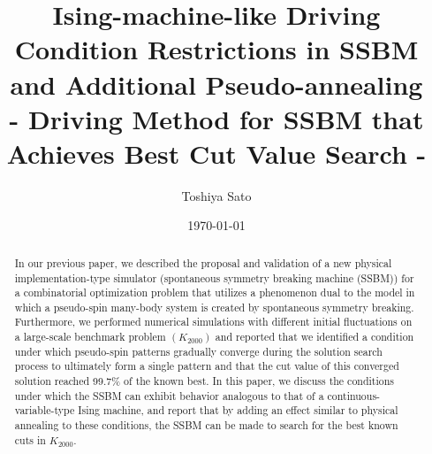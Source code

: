 \documentclass[%
 reprint,
 amsmath,amssymb,
 aps,
]{revtex4-2}
\begin{document}

\title{Ising-machine-like Driving Condition Restrictions in SSBM and Additional Pseudo-annealing\\- Driving Method for SSBM that Achieves Best Cut Value Search -} %



\author{Toshiya Sato}


\date{\today}

\begin{abstract}
In our previous paper, we described the proposal and validation of a new physical implementation-type simulator (spontaneous symmetry breaking machine (SSBM)) for a combinatorial optimization problem that utilizes a phenomenon dual to the model in which a pseudo-spin many-body system is created by spontaneous symmetry breaking.
Furthermore, we performed numerical simulations with different initial fluctuations on a large-scale benchmark problem $(K_{2000})$ and reported that we identified a condition under which pseudo-spin patterns gradually converge during the solution search process to ultimately form a single pattern and that the cut value of this converged solution reached 99.7\% of the known best.
In this paper, we discuss the conditions under which the SSBM can exhibit behavior analogous to that of a continuous-variable-type Ising machine, and report that by adding an effect similar to physical annealing to these conditions, the SSBM can be made to search for the best known cuts in $K_{2000}$.
\end{abstract}
\end{document}
